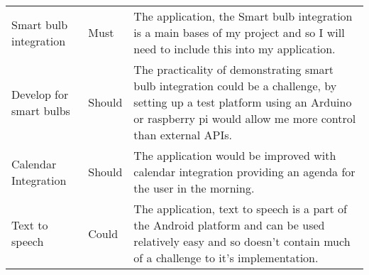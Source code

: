 \begin{longtable}[]{@{}lll@{}}
\begin{minipage}[t]{0.22\columnwidth}\raggedright\strut
Smart bulb integration\strut
\end{minipage} & \begin{minipage}[t]{0.10\columnwidth}\raggedright\strut
Must\strut
\end{minipage} & \begin{minipage}[t]{0.60\columnwidth}\raggedright\strut
The application, the Smart bulb integration is a main bases of my
project and so I will need to include this into my application.\strut
\end{minipage}\tabularnewline
\begin{minipage}[t]{0.22\columnwidth}\raggedright\strut
Develop for smart bulbs\strut
\end{minipage} & \begin{minipage}[t]{0.10\columnwidth}\raggedright\strut
Should\strut
\end{minipage} & \begin{minipage}[t]{0.60\columnwidth}\raggedright\strut
The practicality of demonstrating smart bulb integration could be a
challenge, by setting up a test platform using an Arduino or raspberry
pi would allow me more control than external APIs.\strut
\end{minipage}\tabularnewline
\begin{minipage}[t]{0.22\columnwidth}\raggedright\strut
Calendar Integration\strut
\end{minipage} & \begin{minipage}[t]{0.10\columnwidth}\raggedright\strut
Should\strut
\end{minipage} & \begin{minipage}[t]{0.60\columnwidth}\raggedright\strut
The application would be improved with calendar integration providing an
agenda for the user in the morning.\strut
\end{minipage}\tabularnewline
\begin{minipage}[t]{0.22\columnwidth}\raggedright\strut
Text to speech\strut
\end{minipage} & \begin{minipage}[t]{0.10\columnwidth}\raggedright\strut
Could\strut
\end{minipage} & \begin{minipage}[t]{0.60\columnwidth}\raggedright\strut
The application, text to speech is a part of the Android platform and
can be used relatively easy and so doesn't contain much of a challenge
to it's implementation.\strut
\end{minipage}\tabularnewline
\bottomrule
\end{longtable}

